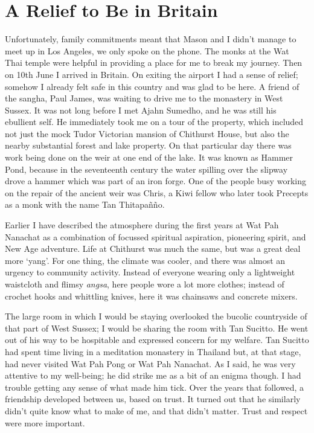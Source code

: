 \chapter{A Relief to Be in Britain}

Unfortunately, family commitments meant that Mason and I didn't manage
to meet up in Los Angeles, we only spoke on the phone. The monks at the
Wat Thai temple were helpful in providing a place for me to break my
journey. Then on 10th June I arrived in Britain. On exiting the airport
I had a sense of relief; somehow I already felt safe in this country and
was glad to be here. A friend of the sangha, Paul James, was waiting to
drive me to the monastery in West Sussex. It was not long before I met
Ajahn Sumedho, and he was still his ebullient self. He immediately took
me on a tour of the property, which included not just the mock Tudor
Victorian mansion of Chithurst House\cite{cbm-house},
but also the nearby substantial forest and lake
property. On that particular day there was work being done on the weir
at one end of the lake. It was known as Hammer Pond, because in the
seventeenth century the water spilling over the slipway drove a hammer
which was part of an iron forge. One of the people busy working on the
repair of the ancient weir was Chris, a Kiwi fellow who later took
Precepts as a monk with the name Tan Thitapañño.

Earlier I have described the atmosphere during the first years at Wat
Pah Nanachat as a combination of focussed spiritual aspiration,
pioneering spirit, and New Age adventure. Life at Chithurst was much the
same, but was a great deal more `yang'. For one thing, the climate was
cooler, and there was almost an urgency to community activity. Instead
of everyone wearing only a lightweight waistcloth and flimsy
\emph{angsa}, here people wore a lot more clothes; instead of crochet
hooks and whittling knives, here it was chainsaws and concrete mixers.

The large room in which I would be staying overlooked the bucolic
countryside of that part of West Sussex; I would be sharing the room
with Tan Sucitto. He went out of his way to be hospitable and expressed
concern for my welfare. Tan Sucitto had spent time living in a
meditation monastery in Thailand but, at that stage, had never visited
Wat Pah Pong or Wat Pah Nanachat. As I said, he was very attentive to my
well-being; he did strike me as a bit of an enigma though. I had trouble
getting any sense of what made him tick. Over the years that followed, a
friendship developed between us, based on trust. It turned out that he
similarly didn't quite know what to make of me, and that didn't matter.
Trust and respect were more important.

